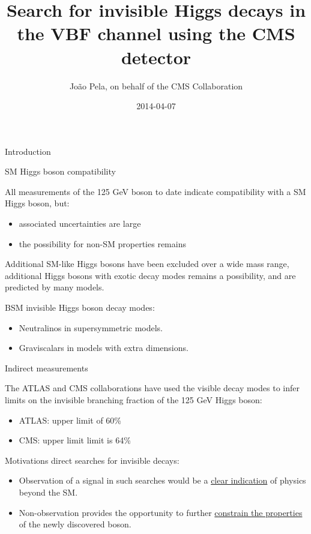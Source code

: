 \documentclass[8pt]{beamer}
\author[J. Pela]{João Pela, on behalf of the CMS Collaboration}
\title[Search for VBF Higgs $\rightarrow$ Inv at CMS]{Search for invisible Higgs decays in the VBF channel using the CMS detector}
\institute[ICL]{Imperial College London}
\date{2014-04-07}
\newcommand\Fontvi{\fontsize{6}{7.2}\selectfont}
\begin{document}
\setlength{\unitlength}{1mm}

\begin{frame}
  \titlepage
\end{frame}

\begin{frame}{Introduction}
\Fontvi
 
\begin{block}{SM Higgs boson compatibility}
 
All measurements of the 125 GeV boson to date indicate compatibility with a SM Higgs boson, but:
\begin{itemize}
 \item associated uncertainties are large
 \item the possibility for non-SM properties remains
\end{itemize}

Additional SM-like Higgs bosons have been excluded over a wide mass range, additional Higgs bosons with exotic decay modes remains a possibility, and are predicted by many models.

\end{block}

\begin{block}{BSM invisible Higgs boson decay modes:}

\begin{itemize}
 \item Neutralinos in supersymmetric models.
 \item Graviscalars in models with extra dimensions. 
\end{itemize}

\end{block}

\begin{block}{Indirect measurements}

The ATLAS and CMS collaborations have used the visible decay modes to infer limits on the invisible branching fraction of the 125 GeV Higgs boson:
\begin{itemize}
 \item ATLAS: upper limit of 60\%
 \item CMS: upper limit limit is 64\%
\end{itemize}

\end{block}

\begin{block}{Motivations direct searches for invisible decays:}

\begin{itemize}
 \item Observation of a signal in such searches would be a \uline{clear indication} of physics beyond the SM.
 \item Non-observation provides the opportunity to further \uline{constrain the properties} of the newly discovered boson.
\end{itemize}

\end{block}
 
\end{frame}
\end{document}
